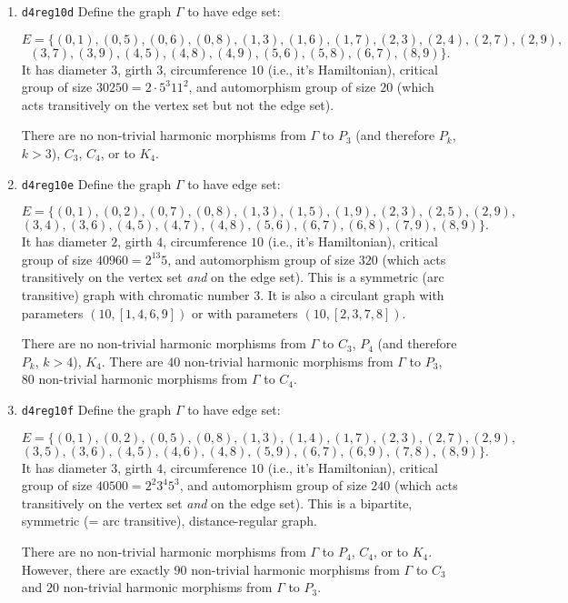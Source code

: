\documentclass[12pt,letterpaper]{article}
\theoremstyle{definition}
\begin{document}
\begin{enumerate}
\item
  {\tt d4reg10d}\newline  
  Define the graph  $\Gamma$
  to have edge set:

\[
E = \{
(0, 1), (0, 5), (0, 6), (0, 8), (1, 3), (1, 6), (1, 7), (2, 3), (2, 4), (2, 7), (2, 9),
\]
\[
(3, 7), (3, 9), (4, 5), (4, 8), (4, 9), (5, 6), (5, 8), (6, 7), (8, 9)
\}.
\]
It has diameter $3$,
girth $3$, circumference $10$ (i.e., it's Hamiltonian),
critical group of size $30250 = 2\cdot 5^3 11^2$, 
and automorphism group of size $20$ (which acts transitively on the vertex set
but not the edge set).

There are no non-trivial harmonic morphisms from $\Gamma$ to $P_3$
(and therefore $P_k$, $k>3$), $C_3$, $C_4$, or to $K_4$.


\item
  {\tt d4reg10e}\newline  
  Define the graph  $\Gamma$
  to have edge set:

\[
E = \{
(0, 1), (0, 2), (0, 7), (0, 8), (1, 3), (1, 5), (1, 9), (2, 3), (2, 5), (2, 9),
\]
\[
(3, 4), (3, 6), (4, 5), (4, 7), (4, 8), (5, 6), (6, 7), (6, 8), (7, 9), (8, 9)
\}.
\]
It has diameter $2$,
girth $4$, circumference $10$ (i.e., it's Hamiltonian),
critical group of size $40960 =  2^{13} 5$, 
and automorphism group of size $320$ (which acts transitively on the vertex set {\it and} on the edge set). This is a symmetric (arc transitive) graph
with chromatic number $3$.
It is also a circulant graph with parameters
$(10, [1, 4, 6, 9])$ or with parameters $(10, [2, 3, 7, 8])$.

There are no non-trivial harmonic morphisms from $\Gamma$ to $C_3$,
$P_4$ (and therefore $P_k$, $k>4$), $K_4$.
There are $40$ non-trivial harmonic morphisms from $\Gamma$ to $P_3$,
$80$ non-trivial harmonic morphisms from $\Gamma$ to $C_4$.

\item
  {\tt d4reg10f}\newline  
  Define the graph  $\Gamma$
  to have edge set:

\[
E = \{
(0, 1), (0, 2), (0, 5), (0, 8), (1, 3), (1, 4), (1, 7), (2, 3), (2, 7), (2, 9),
\]
\[
(3, 5), (3, 6), (4, 5), (4, 6), (4, 8), (5, 9), (6, 7), (6, 9), (7, 8), (8, 9)
\}.
\]
It has diameter $3$,
girth $4$, circumference $10$ (i.e., it's Hamiltonian),
critical group of size $40500 = 2^2 3^4 5^3$, 
and automorphism group of size $240$ (which acts transitively on the vertex set {\it and} on the edge set). This is a bipartite, symmetric (= arc transitive), distance-regular graph.

There are no non-trivial harmonic morphisms from $\Gamma$ to $P_4$, $C_4$, or to $K_4$.
However, there are exactly $90$ non-trivial harmonic morphisms from $\Gamma$ to $C_3$ and $20$ non-trivial harmonic morphisms from $\Gamma$ to $P_3$.

\end{enumerate}
\end{document}
